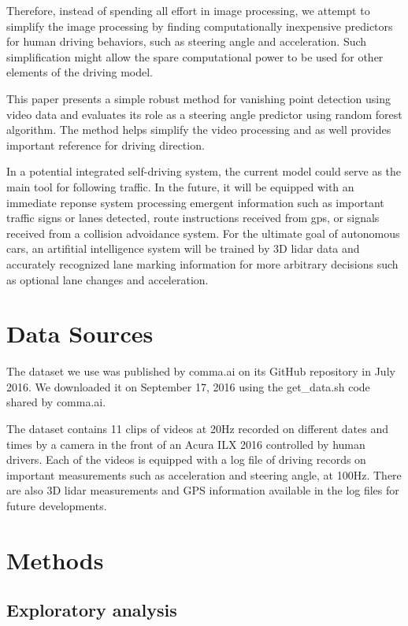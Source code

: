 \documentclass[11pt, oneside]{article}
\begin{document}
Therefore, instead of spending all effort in image processing, we attempt to simplify the image processing by finding computationally inexpensive predictors for human driving behaviors, such as steering angle and acceleration. Such simplification might allow the spare computational power to be used for other elements of the driving model. 

This paper presents a simple robust method for vanishing point detection using video data and evaluates its role as a steering angle predictor using random forest algorithm. The method helps simplify the video processing and as well provides important reference for driving direction. 

In a potential integrated self-driving system, the current model could serve as the main tool for following traffic. In the future, it will be equipped with an immediate reponse system processing emergent information such as important traffic signs or lanes detected, route instructions received from gps, or signals received from a collision advoidance system. For the ultimate goal of autonomous cars, an artifitial intelligence system will be trained by 3D lidar data and accurately recognized lane marking information for more arbitrary decisions such as optional lane changes and acceleration. 


\section*{Data Sources}

The dataset we use was published by comma.ai on its GitHub repository in July 2016. We downloaded it on September 17, 2016 using the get\_data.sh code shared by comma.ai. 

The dataset contains 11 clips of videos at 20Hz recorded on different dates and times by a camera in the front of an Acura ILX 2016 controlled by human drivers. Each of the videos is equipped with a log file of driving records on important measurements such as acceleration and steering angle, at 100Hz. There are also 3D lidar measurements and GPS information available in the log files for future developments. 

\section*{Methods}

\subsection*{Exploratory analysis}
\end{document}
